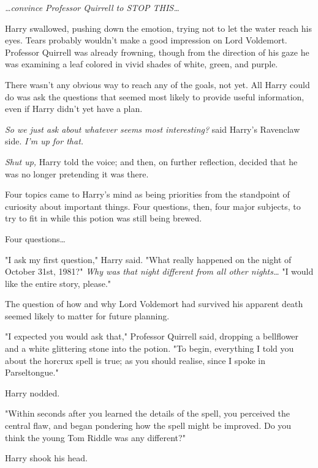 \emph{{\ldots}convince Professor Quirrell to STOP THIS{\ldots}}

Harry swallowed, pushing down the emotion, trying not to let the water reach
his eyes. Tears probably wouldn't make a good impression on Lord Voldemort.
Professor Quirrell was already frowning, though from the direction of his gaze
he was examining a leaf colored in vivid shades of white, green, and purple.

There wasn't any obvious way to reach any of the goals, not yet. All Harry
could do was ask the questions that seemed most likely to provide useful
information, even if Harry didn't yet have a plan.

\emph{So we just ask about whatever seems most interesting?} said Harry's
Ravenclaw side. \emph{I'm up for that.}

\emph{Shut up,} Harry told the voice; and then, on further reflection, decided
that he was no longer pretending it was there.

Four topics came to Harry's mind as being priorities from the standpoint of
curiosity about important things. Four questions, then, four major subjects, to
try to fit in while this potion was still being brewed.

Four questions{\ldots}

"I ask my first question," Harry said. "What really happened on the night of
October 31st, 1981?" \emph{Why was that night different from all other
nights{\ldots}} "I would like the entire story, please."

The question of how and why Lord Voldemort had survived his apparent death
seemed likely to matter for future planning.

"I expected you would ask that," Professor Quirrell said, dropping a bellflower
and a white glittering stone into the potion. "To begin, everything I told you
about the horcrux spell is true; as you should realise, since I spoke in
Parseltongue."

Harry nodded.

"Within seconds after you learned the details of the spell, you perceived the
central flaw, and began pondering how the spell might be improved. Do you think
the young Tom Riddle was any different?"

Harry shook his head.

